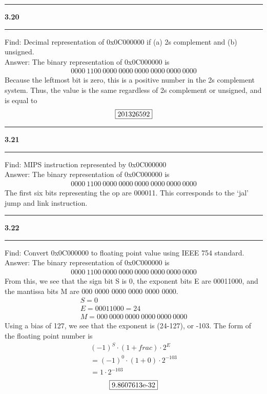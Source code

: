 \documentclass[11pt]{article}
\newcommand\question[2]{\vspace{.25in}\hrule\textbf{#1 #2}\vspace{.5em}\hrule\vspace{.10in}}
\begin{document}
\question{3.20}{} 
Find: Decimal representation of 0x0C000000 if (a) 2s complement and (b) unsigned. \\
\vspace{5mm}
Answer: The binary representation of 0x0C000000 is 
\begin{gather*}
0000 \ 1100 \ 0000 \ 0000 \ 0000 \ 0000 \ 0000 \ 0000
\end{gather*}
Because the leftmost bit is zero, this is a positive number in the 2s complement system. Thus, the value is the same regardless of 2s complement or unsigned, and is equal to 
\begin{gather*}
\fbox{201326592}
\end{gather*}

\question{3.21}{}
Find: MIPS instruction represented by 0x0C000000 \\
\vspace{5mm}
Answer: The binary representation of 0x0C000000 is 
\begin{gather*}
0000 \ 1100 \ 0000 \ 0000 \ 0000 \ 0000 \ 0000 \ 0000
\end{gather*}
The first six bits representing the op are 000011. This corresponds to the `jal' jump and link instruction. 

\question{3.22}{} 
Find: Convert 0x0C000000 to floating point value using IEEE 754 standard. \\
\vspace{5mm}
Answer: The binary representation of 0x0C000000 is 
\begin{gather*}
0000 \ 1100 \ 0000 \ 0000 \ 0000 \ 0000 \ 0000 \ 0000
\end{gather*}
From this, we see that the sign bit S is 0, the exponent bits E are 00011000, and the mantissa bits M are 000 0000 0000 0000 0000 0000.
\begin{gather*}
S = 0 \\
E = 00011000 = 24 \\
M = 000 \ 0000 \ 0000 \ 0000 \ 0000 \ 0000
\end{gather*}
Using a bias of 127, we see that the exponent is (24-127), or -103. The form of the floating point number is 
\begin{align*}
(-1)^S  \cdot (1 + frac) \cdot 2^{E} \\ = (-1)^0  \cdot (1 + 0) \cdot 2^{-103} \\ = 1 \cdot 2^{-103}
\end{align*}
\begin{gather*}
\fbox{9.8607613e-32}
\end{gather*}
\end{document}
